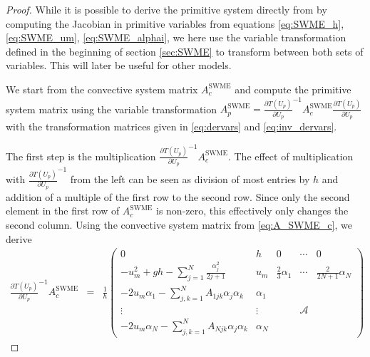 \documentclass[a4paper, 11pt]{article}
\begin{document}
\begin{proof}
    While it is possible to derive the primitive system directly from by computing the Jacobian in primitive variables from equations \eqref{eq:SWME_h}, \eqref{eq:SWME_um}, \eqref{eq:SWME_alphai}, we here use the variable transformation defined in the beginning of section \ref{sec:SWME} to transform between both sets of variables. This will later be useful for other models.

    We start from the convective system matrix $A^{\textrm{SWME}}_{c}$ and compute the primitive system matrix using the variable transformation $A^{\textrm{SWME}}_{p} = \frac{\partial T\left(U_{p}\right)}{\partial U_{p}}^{-1} A^{\textrm{SWME}}_{c} \frac{\partial  T\left(U_{p}\right)}{\partial U_{p}}$ with the transformation matrices given in \eqref{eq:dervars} and \eqref{eq:inv_dervars}.

    The first step is the multiplication $\frac{\partial T\left(U_{p}\right)}{\partial U_{p}}^{-1} A^{\textrm{SWME}}_{c}$. The effect of multiplication with $\frac{\partial T\left(U_{p}\right)}{\partial U_{p}}^{-1}$ from the left can be seen as division of most entries by $h$ and addition of a multiple of the first row to the second row. Since only the second element in the first row of $A^{\textrm{SWME}}_{c}$ is non-zero, this effectively only changes the second column. Using the convective system matrix from \eqref{eq:A_SWME_c}, we derive
    \begin{eqnarray}
        \frac{\partial T\left(U_{p}\right)}{\partial U_{p}}^{-1} A^{\textrm{SWME}}_{c} %
        &=& \frac{1}{h} \left(\begin{array}{ccccc}
        0 & h & 0 & \cdots & 0 \\
        - u_m^2 + gh - \sum\limits_{j=1}^{N} \frac{\alpha_j^2}{2j+1} & u_m & \frac{2}{3} \alpha_1 & \cdots & \frac{2}{2 N+1} \alpha_N \\
        -2 u_m \alpha_1 - \sum\limits_{j,k=1}^{N} A_{1jk} \alpha_j \alpha_k & \alpha_1 &  & & \\
        \vdots & \vdots & & \mathcal{A} &  \\
        -2 u_m \alpha_N - \sum\limits_{j,k=1}^{N} A_{Njk} \alpha_j \alpha_k & \alpha_N &  & &
        \end{array}\right)
    \end{eqnarray}


\end{proof}
\end{document}
